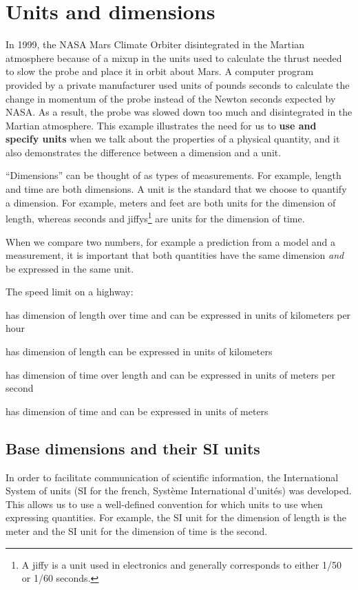 \section{Units and dimensions}
In 1999, the NASA Mars Climate Orbiter disintegrated in the Martian atmosphere because of a mixup in the units used to calculate the thrust needed to slow the probe and place it in orbit about Mars. A computer program provided by a private manufacturer used units of pounds seconds to calculate the change in momentum of the probe instead of the Newton seconds expected by NASA. As a result, the probe was slowed down too much and disintegrated in the Martian atmosphere. This example illustrates the need for us to \textbf{use and specify units} when we talk about the properties of a physical quantity, and it also demonstrates the difference between a dimension and a unit.

``Dimensions'' can be thought of as types of measurements. For example, length and time are both dimensions. A unit is the standard that we choose to quantify a dimension. For example, meters and feet are both units for the dimension of length, whereas seconds and jiffys\footnote{A jiffy is a unit used in electronics and generally corresponds to either 1/50 or 1/60 seconds.} are units for the dimension of time.

When we compare two numbers, for example a prediction from a model and a measurement, it is important that both quantities have the same dimension \textit{and} be expressed in the same unit.
\begin{checkpoint}
\begin{MCquestion}{The speed limit on a highway:}
\item has dimension of length over time and can be expressed in units of kilometers per hour %
\item has dimension of length can be expressed in units of kilometers
\item has dimension of time over length and can be expressed in units of meters per second
\item has dimension of time and can be expressed in units of meters
\end{MCquestion}
\end{checkpoint}

\subsection{Base dimensions and their SI units}
In order to facilitate communication of scientific information, the International System of units (SI for the french, Syst\`eme International d'unit\'es) was developed. This allows us to use a well-defined convention for which units to use when expressing quantities. For example, the SI unit for the dimension of length is the meter and the SI unit for the dimension of time is the second.

